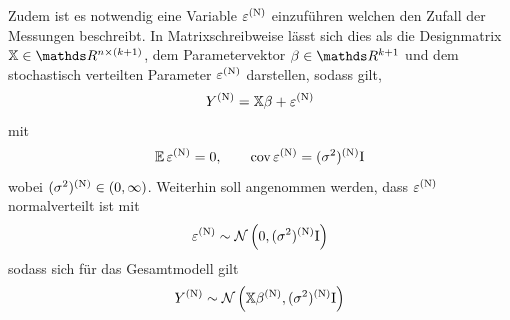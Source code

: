 		Zudem ist es notwendig eine Variable $\varepsilon^{\mathrm{(N)}}$ einzuführen welchen den Zufall der Messungen beschreibt.
	    In Matrixschreibweise lässt sich dies als die Designmatrix $\mathbb{X} \in \SR^{n \times (k+1)}$, dem Parametervektor $\beta \in \SR^{k+1}$ und dem stochastisch  verteilten Parameter $\varepsilon^{\mathrm{(N)}}$ darstellen, sodass gilt,
		\[
			Y^{\mathrm{(N)}} = \mathbb{X}\beta + \varepsilon^{\mathrm{(N)}}
		\]
		mit
		\[
			\operatorname{\mathbb{E}} \varepsilon^{\mathrm{(N)}} = 0, \qquad \operatorname{cov} \varepsilon^{\mathrm{(N)}} = (\sigma^2)^{\mathrm{(N)}} \mathrm{I}
		\]
		wobei $(\sigma^2)^{\mathrm{(N)}} \in (0,\infty)$.
		Weiterhin soll angenommen werden, dass $\varepsilon^{\mathrm{(N)}}$ normalverteilt ist mit
	    \[
			\varepsilon^{\mathrm{(N)}} \sim \mathcal{N} \left( 0,(\sigma^2)^{\mathrm{(N)}}\mathrm{I} \right)
		\]
	    sodass sich für das Gesamtmodell gilt
		\[
			Y^{\mathrm{(N)}} \sim \mathcal{N} \left( \mathbb{X}\beta^{\mathrm{(N)}},(\sigma^2)^{\mathrm{(N)}} \mathrm{I} \right)
		\]


